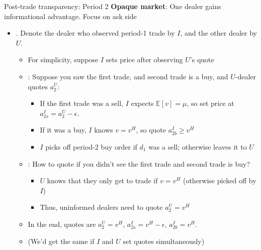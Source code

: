 \documentclass[english,10pt
,aspectratio=169
]{beamer}
\begin{document}
\begin{frame}{Post-trade transparency: Period 2}
	\textbf{Opaque market}: One dealer gains informational advantage. Focus on \alert{ask side}
	\begin{itemize}
		\item {}. Denote the dealer who observed period-1 trade by \alert{$I$}, and the other dealer by \alert{$U$}.
		\begin{itemize}
			\item For simplicity, suppose $I$ sets price after observing $U$'s quote
			\item {}: Suppose you saw the first trade, and second trade is a buy, and $U$-dealer quotes $a_2^U$:
			\begin{itemize}
				\item If the first trade was a sell, $I$ expects $\mathbb{E}[v]=\mu$, so set price at $a^I_{2s}=a^U_2 - \epsilon$.
				\item If it was a buy, $I$ knows $v=v^H$, so quote $a^I_{2b} \geq v^H$
				\item $I$ picks off period-2 buy order if $d_1$ was a sell; otherwise leaves it to $U$
			\end{itemize}
			\item {}: How to quote if you didn't see the first trade and second trade is buy? 
			\begin{itemize}
				\item $U$ knows that they only get to trade if $v=v^H$ (otherwise picked off by $I$)
				\item Thus, uninformed dealers need to quote $a^U_2=v^{H}$
			\end{itemize}
			\item In the end, quotes are $a^U_2=v^{H}$, $a^I_{2s}=v^H - \epsilon$, $a^I_{2b}=v^H$.
			\item (We'd get the same if $I$ and $U$ set quotes simultaneously)
		\end{itemize}
	\end{itemize}
\end{frame}
\end{document}
